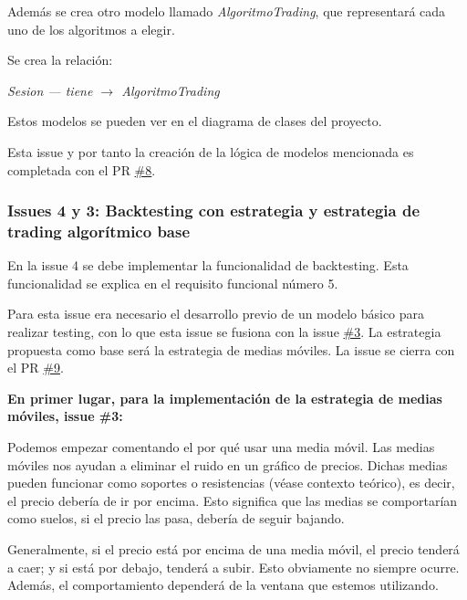 Además se crea otro modelo llamado \textit{AlgoritmoTrading}, que representará cada uno de los algoritmos a elegir. \newline

Se crea la relación: \newline

\textit{Sesion --- tiene $\rightarrow$ AlgoritmoTrading} \newline

Estos modelos se pueden ver en el diagrama de clases del proyecto.\newline

Esta issue y por tanto la creación de la lógica de modelos mencionada es completada con el PR \href{https://github.com/mcarmona99/TFG/pull/8}{\#8}.\newline


\subsubsection{Issues 4 y 3: Backtesting con estrategia y estrategia de trading algorítmico base}

En la issue 4 se debe implementar la funcionalidad de backtesting. Esta funcionalidad se explica en el requisito funcional número 5. \newline

Para esta issue era necesario el desarrollo previo de un modelo básico para realizar testing, con lo que esta issue se fusiona con la issue \href{https://github.com/mcarmona99/TFG/issues/4}{\#3}. La estrategia propuesta como base será la estrategia de medias móviles. La issue se cierra con el PR \color{blue}\href{https://github.com/mcarmona99/TFG/pull/9}{\#9}\color{black}. \newline

\textbf{En primer lugar, para la implementación de la estrategia de medias móviles, issue \#3:}\newline

Podemos empezar comentando el por qué usar una media móvil. Las medias móviles nos ayudan a eliminar el ruido en un gráfico de precios. Dichas medias pueden funcionar como soportes o resistencias (véase contexto teórico), es decir, el precio debería de ir por encima. Esto significa que las medias se comportarían como suelos, si el precio las pasa, debería de seguir bajando.\newline

Generalmente, si el precio está por encima de una media móvil, el precio tenderá a caer; y si está por debajo, tenderá a subir. Esto obviamente no siempre ocurre. Además, el comportamiento dependerá de la ventana que estemos utilizando.\newline

